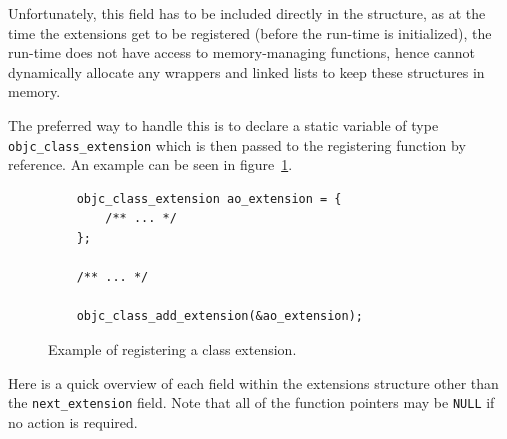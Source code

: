 Unfortunately, this field has to be included directly in the structure, as at the time the extensions get to be registered (before the run-time is initialized), the run-time does not have access to memory-managing functions, hence cannot dynamically allocate any wrappers and linked lists to keep these structures in memory.

The preferred way to handle this is to declare a static variable of type \newline{}\verb=objc_class_extension= which is then passed to the registering function by reference. An example can be seen in figure~\ref{fig:class_ext_struct_example}.

\begin{figure}[H] 
  \begin{verbatim}
    objc_class_extension ao_extension = { 
        /** ... */ 
    };
    
    /** ... */
    
    objc_class_add_extension(&ao_extension);
  \end{verbatim}
  \centering{}
  \caption{Example of registering a class extension.}
  \label{fig:class_ext_struct_example}
\end{figure}


Here is a quick overview of each field within the extensions structure other than the \verb=next_extension= field. Note that all of the function pointers may be \texttt{NULL} if no action is required.

